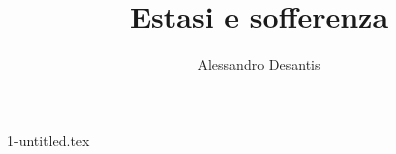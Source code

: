 \documentclass[a4paper,oneside,11pt]{memoir}
\title{Estasi e sofferenza}
\author{Alessandro Desantis}
\date{}
\begin{document}
    \begin{titlingpage}
        \maketitle
    \end{titlingpage}


    {1-untitled.tex}
\end{document}

